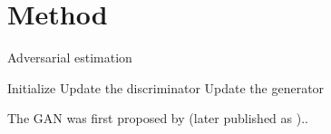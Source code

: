 \section{Method}
\label{sec:method}



\begin{algorithm}
    \caption{Adversarial estimation}
    \label{alg:adversarial_estimation}
    \begin{algorithmic}
        \STATE Initialize
            \STATE Update the discriminator
            \STATE Update the generator
        \ENDFOR
    \end{algorithmic}
\end{algorithm}

The GAN was first proposed by \textcite{goodfellow2014generative} (later published as \textcite{goodfellow2020generative})..
